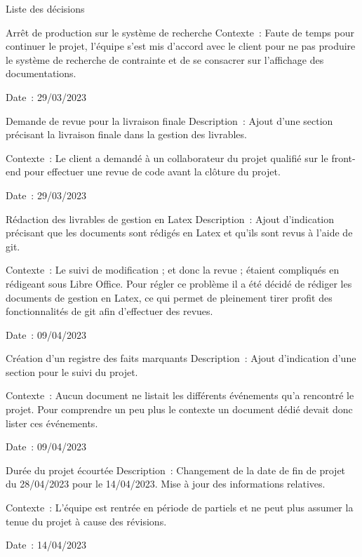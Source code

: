 \documentclass[]{article}
\begin{document}
{\begin{section}{Liste des décisions}
\begin{subsection}{Arrêt de production sur le système de recherche}
     Contexte : Faute de temps pour continuer le projet, l’équipe s’est mis d’accord avec le client pour ne pas produire le système de recherche de contrainte et de se consacrer sur l’affichage des documentations.

     Date : 29/03/2023
 \end{subsection}
 \newpage
 \begin{subsection}{Demande de revue pour la livraison finale}
     Description : Ajout d’une section précisant la livraison finale dans la gestion des livrables.

     Contexte : Le client a demandé à un collaborateur du projet qualifié sur le front-end pour effectuer une revue de code avant la clôture du projet.

     Date : 29/03/2023
 \end{subsection}

 \begin{subsection}{Rédaction des livrables de gestion en Latex}
    Description : Ajout d'indication précisant que les documents sont rédigés en Latex et qu'ils sont revus à l'aide de git.

    Contexte : Le suivi de modification ; et donc la revue ; étaient compliqués en rédigeant sous Libre Office. Pour régler ce problème il a été décidé de rédiger les documents de gestion en Latex, ce qui permet de pleinement tirer profit des fonctionnalités de git afin d'effectuer des revues.

    Date : 09/04/2023
\end{subsection}

\begin{subsection}{Création d'un registre des faits marquants}
    Description : Ajout d'indication d'une section pour le suivi du projet.

    Contexte : Aucun document ne listait les différents événements qu'a rencontré le projet. Pour comprendre un peu plus le contexte un document dédié devait donc lister ces événements.

    Date : 09/04/2023
\end{subsection}

\begin{subsection}{Durée du projet écourtée}
    Description : Changement de la date de fin de projet du 28/04/2023 pour le 14/04/2023. Mise à jour des informations relatives.

    Contexte : L'équipe est rentrée en période de partiels et ne peut plus assumer la tenue du projet à cause des révisions.

    Date : 14/04/2023
\end{subsection}
\end{section}
}
\end{document}
